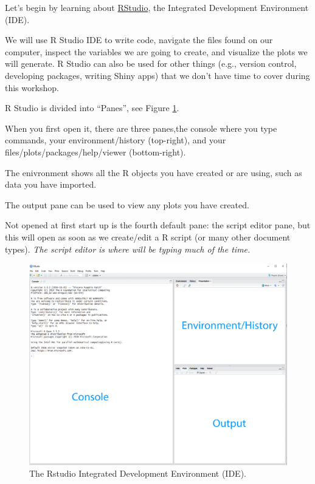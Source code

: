 \documentclass[12pt,]{book}
\begin{document}
Let's begin by learning about \href{https://www.rstudio.com/}{RStudio}, the
Integrated Development Environment (IDE).

We will use R Studio IDE to write code, navigate the files found on our computer,
inspect the variables we are going to create, and visualize the plots we will
generate. R Studio can also be used for other things (e.g., version control,
developing packages, writing Shiny apps) that we don't have time to cover during
this workshop.

R Studio is divided into ``Panes'', see Figure \ref{fig:rstudio}.

When you first open it, there are three panes,the console where you type
commands, your environment/history (top-right), and your
files/plots/packages/help/viewer (bottom-right).

The enivronment shows all the R objects you have created or are using, such
as data you have imported.

The output pane can be used to view any plots you have created.

Not opened at first start up is the fourth default pane: the script editor pane,
but this will open as soon as we create/edit a R script (or many other document types).
\emph{The script editor is where will be typing much of the time.}



\begin{figure}

{\centering \includegraphics[width=0.8\linewidth]{img/rstudio_ide_image} 

}

\caption{The Rstudio Integrated Development Environment (IDE).}\label{fig:rstudio}
\end{figure}
\end{document}
